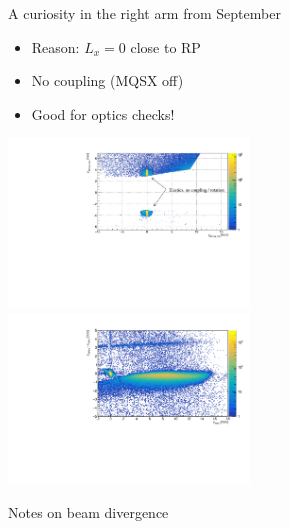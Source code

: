 \documentclass{beamer}
\begin{document}
\begin{frame}\scriptsize
	\begin{block}{A curiosity in the right arm from September}
    		\begin{itemize}
			\item Reason: $L_{x}=0$ close to RP
			\item No coupling (MQSX off)
			\item Good for optics checks!
		\end{itemize}
	\begin{center}
             \includegraphics[width=0.48\textwidth]{RP_104_105_elastics_curiosity.pdf}\\
             \includegraphics[width=0.48\textwidth]{x_check.pdf}
		\end{center}
	\end{block}
	
\end{frame}


\begin{frame}
	\begin{center}
	\Large
	Notes on beam divergence
	\end{center}
\end{frame}
\end{document}
